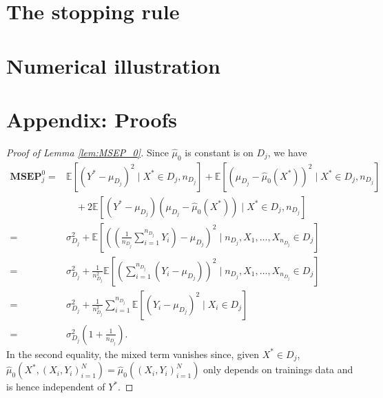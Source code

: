 \documentclass[11pt,a4paper]{article}
\newcommand{\E }{\mathbb{E}}  %
\newcommand{\MSEP}{\textbf{MSEP}}
\begin{document}
%




\section{The stopping rule}

\section{Numerical illustration}

\section{Appendix: Proofs}

\begin{proof}[Proof of Lemma \ref{lem:MSEP_0}]
	Since $\hat \mu_0$ is constant is on $D_j$, we have
	\begin{align*}
		\MSEP_j^0  = & \E\left[ (Y^* - \mu_{D_j})^2 \mid X^* \in D_j,  n_{D_j} \right]
		+ \E \left[ (\mu_{D_j} - \hat\mu_0(X^*))^2 \mid X^* \in D_j, n_{D_j} \right]                                                                           \\
		             & \quad + 2\E \left[ (Y^* - \mu_{D_j})( \mu_{D_j} - \widehat \mu_0(X^*)) \mid X^* \in D_j,  n_{D_j}  \right]                              \\
		=            & \sigma_{D_j}^2 +
		\E \left[ \left(\left(\frac{1}{n_{D_j}}\sum_{i =1}^{n_{D_j}} Y_i \right) - \mu_{D_j}  \right)^2 \mid  n_{D_j}, X_1, \dots, X_{n_{D_j}} \in D_j \right] \\
		=            & \sigma_{D_j}^2 +
		\frac{1}{n_{D_j}^2}\E \left[ \left(\sum_{i =1}^{n_{D_j}} (Y_i - \mu_{D_j}) \right)^2 \mid  n_{D_j}, X_1, \dots, X_{n_{D_j}} \in D_j  \right]           \\
		=            & \sigma_{D_j}^2 +
		\frac{1}{n_{D_j}^2}\sum_{i =1}^{n_{D_j}} \E \left[(Y_i - \mu_{D_j})^2 \mid X_i \in D_j \right]                                                         \\
		=            & \sigma_{{D_j}}^2\left(1 + \frac{1}{n_{D_j}} \right).
	\end{align*}
	In the second equality, the mixed term vanishes since, given $X^* \in D_j$, $\hat \mu_0(X^*, (X_i, Y_i)_{i=1}^N) = \hat \mu_0((X_i, Y_i)_{i=1}^N)$ only depends on trainings data and is hence independent of $Y^*$.
\end{proof}
\end{document}
